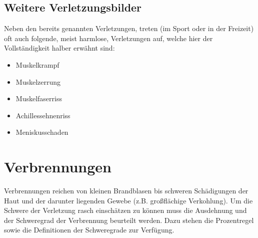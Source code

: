 
\subsection{Weitere Verletzungsbilder}
Neben den bereits genannten Verletzungen, treten (im Sport oder in der Freizeit) oft auch folgende, meist harmlose, Verletzungen auf, welche hier der Vollständigkeit halber erwähnt sind:
\begin{itemize}
	\item Muskelkrampf
	\item Muskelzerrung
	\item Muskelfaserriss
	\item Achillessehnenriss
	\item Meniskusschaden
\end{itemize}


\section{Verbrennungen}


Verbrennungen reichen von kleinen Brandblasen bis schweren Schädigungen der Haut und der darunter liegenden Gewebe (z.B. großflächige Verkohlung). Um die Schwere der Verletzung rasch einschätzen zu können muss die Ausdehnung und der Schweregrad der Verbrennung beurteilt werden. Dazu stehen die Prozentregel sowie die Definitionen der Schweregrade zur Verfügung.

